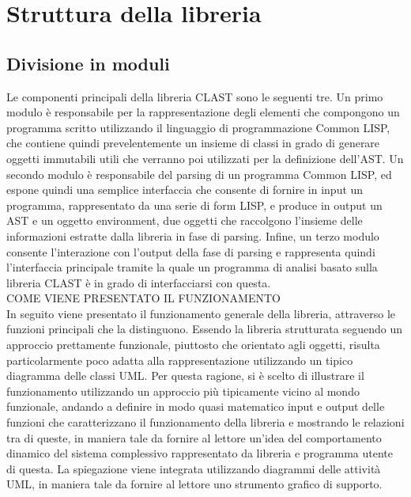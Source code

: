 \section{Struttura della libreria}

\subsection{Divisione in moduli}
Le componenti principali della libreria CLAST sono le seguenti tre. Un primo modulo è responsabile per la rappresentazione degli elementi che compongono un programma scritto utilizzando il linguaggio di programmazione Common LISP, che contiene quindi prevelentemente un insieme di classi in grado di generare oggetti immutabili utili che verranno poi utilizzati per la definizione dell'AST. Un secondo modulo è responsabile del parsing di un programma Common LISP, ed espone quindi una semplice interfaccia che consente di fornire in input un programma, rappresentato da una serie di form LISP, e produce in output un AST e un oggetto environment, due oggetti che raccolgono l'insieme delle informazioni estratte dalla libreria in fase di parsing. Infine, un terzo modulo consente l'interazione con l'output della fase di parsing e rappresenta quindi l'interfaccia principale tramite la quale un programma di analisi basato sulla libreria CLAST è in grado di interfacciarsi con questa.\\

COME VIENE PRESENTATO IL FUNZIONAMENTO\\

In seguito viene presentato il funzionamento generale della libreria, attraverso le funzioni principali che la distinguono. Essendo la libreria strutturata seguendo un approccio prettamente funzionale, piuttosto che orientato agli oggetti, risulta particolarmente poco adatta alla rappresentazione utilizzando un tipico diagramma delle classi UML. Per questa ragione, si è scelto di illustrare il funzionamento utilizzando un approccio più tipicamente vicino al mondo funzionale, andando a definire in modo quasi matematico input e output delle funzioni che caratterizzano il funzionamento della libreria e mostrando le relazioni tra di queste, in maniera tale da fornire al lettore un'idea del comportamento dinamico del sistema complessivo rappresentato da libreria e programma utente di questa. La spiegazione viene integrata utilizzando diagrammi delle attività UML, in maniera tale da fornire al lettore uno strumento grafico di supporto.\\


